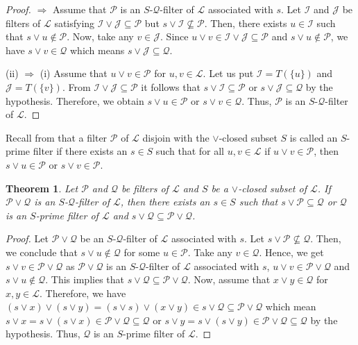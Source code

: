 \documentclass[preprint,review,10pt]{amsart}
\newtheorem{theorem}{Theorem}[section]
\theoremstyle{definition}
\theoremstyle{remark}
\numberwithin{equation}{section}
\begin{document}
\begin{proof}
  $\Longrightarrow$   Assume that  $\mathcal{P}$ is an   $S$-$\mathcal{Q}$-filter of $\mathcal{L}$ associated with $s$. Let  $\mathcal{I}$ and $\mathcal{J}$  be filters of $\mathcal{L}$ satisfying $\mathcal{I} \vee \mathcal{J} \subseteq \mathcal{P}$ but $s \vee \mathcal{I}  \nsubseteq \mathcal{P} $.  Then, there exists $u \in \mathcal{I}$ such that $ s \vee u \notin  \mathcal{P}$. Now, take any $v \in \mathcal{J}$.  Since   $ u \vee v \in \mathcal{I} \vee \mathcal{J} \subseteq \mathcal{P}$ and $s \vee u \notin \mathcal{P}$, we have  $s \vee v \in \mathcal{Q}$ which means  $s \vee \mathcal{J}  \subseteq \mathcal{Q} $.

(ii) $\Longrightarrow$ (i) Assume that $u \vee v \in \mathcal{P}$ for $u,v \in \mathcal{L}$. Let us put $\mathcal{I}=T(\{u\})$ and $\mathcal{J}=T(\{v\})$.   From  $\mathcal{I} \vee \mathcal{J} \subseteq \mathcal{P}$ it follows that  $s \vee \mathcal{I} \subseteq \mathcal{P}$ or  $s \vee \mathcal{J} \subseteq \mathcal{Q}$ by the hypothesis. Therefore, we obtain $s \vee u \in \mathcal{P}$ or  $s \vee v \in \mathcal{Q}$. Thus, $\mathcal{P}$ is an  $S$-$\mathcal{Q}$-filter of $\mathcal{L}$.
\end{proof}
Recall from \cite{Atani2} that a filter $\mathcal{P}$ of $\mathcal{L}$ disjoin with the $\vee$-closed subset $S$ is called an $S$-prime filter if there exists an $s \in S$ such that for all $u,v \in \mathcal{L}$ if $u \vee v \in \mathcal{P}$, then $s \vee u \in \mathcal{P}$ or $s \vee v \in \mathcal{P}$.
\begin{theorem}
Let  $\mathcal{P}$ and $ \mathcal{Q}$ be filters of $\mathcal{L}$ and $S$ be a $\vee$-closed subset of $\mathcal{L}$. If $\mathcal{P} \vee \mathcal{Q}$ is an $S$-$\mathcal{Q}$-filter of $\mathcal{L}$, then there exists an $s \in S$ such that $s \vee \mathcal{P} \subseteq \mathcal{Q}$ or $\mathcal{Q}$ is an $S$-prime filter of $\mathcal{L}$ and $s \vee \mathcal{Q} \subseteq \mathcal{P} \vee \mathcal{Q}$.
\end{theorem}
\begin{proof}
Let $\mathcal{P} \vee \mathcal{Q}$ be an $S$-$\mathcal{Q}$-filter of $\mathcal{L}$ associated with $s$. Let $s \vee \mathcal{P} \nsubseteq \mathcal{Q}$. Then, we conclude that  $s \vee u \notin  \mathcal{Q}$ for some $u \in  \mathcal{P}$. Take any $v \in \mathcal{Q}$. Hence, we get $s \vee v \in \mathcal{P} \vee \mathcal{Q}$ as $\mathcal{P} \vee \mathcal{Q}$ is an $S$-$\mathcal{Q}$-filter of $\mathcal{L}$ associated with $s$, $u \vee v \in \mathcal{P} \vee \mathcal{Q}$ and $s \vee u \notin  \mathcal{Q}$.  This implies that $s \vee \mathcal{Q} \subseteq \mathcal{P} \vee \mathcal{Q}$. Now, assume that $x \vee y \in \mathcal{Q}$ for $x,y \in \mathcal{L}$. Therefore, we have $(s \vee x) \vee (s \vee y)= (s \vee s ) \vee (x \vee y) \in s \vee \mathcal{Q} \subseteq \mathcal{P} \vee \mathcal{Q}$ which mean $s \vee x=s \vee (s \vee x) \in \mathcal{P} \vee \mathcal{Q} \subseteq \mathcal{Q}$ or $s \vee y =s \vee (s \vee y) \in \mathcal{P} \vee \mathcal{Q} \subseteq \mathcal{Q}$ by the hypothesis. Thus, $\mathcal{Q}$ is an $S$-prime filter of $\mathcal{L}$.
\end{proof}
\end{document}
